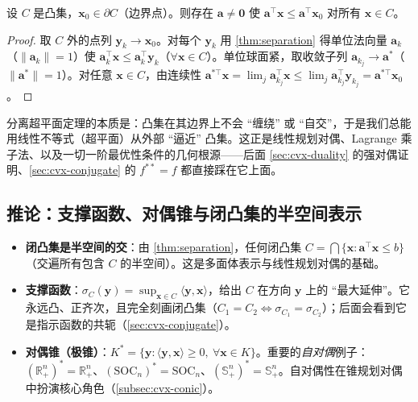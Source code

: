 \begin{theorem}[支撑超平面定理]\label{thm:supporting}
设 $C$ 是凸集，$\mathbf x_0\in\partial C$（边界点）。则存在 $\mathbf a\neq\mathbf 0$ 使 $\mathbf a^\top\mathbf x\le\mathbf a^\top\mathbf x_0$ 对所有 $\mathbf x\in C$。
\end{theorem}
\begin{proof}
取 $C$ 外的点列 $\mathbf y_k\to\mathbf x_0$。对每个 $\mathbf y_k$ 用 \cref{thm:separation} 得单位法向量 $\mathbf a_k$（$\|\mathbf a_k\|=1$）使 $\mathbf a_k^\top\mathbf x\le\mathbf a_k^\top\mathbf y_k$（$\forall\mathbf x\in C$）。单位球面紧，取收敛子列 $\mathbf a_{k_j}\to\mathbf a^\ast$（$\|\mathbf a^\ast\|=1$）。对任意 $\mathbf x\in C$，由连续性 $\mathbf a^{\ast\top}\mathbf x=\lim_j\mathbf a_{k_j}^\top\mathbf x\le\lim_j\mathbf a_{k_j}^\top\mathbf y_{k_j}=\mathbf a^{\ast\top}\mathbf x_0$。
\end{proof}

\begin{insight}[分离定理的本质]\label{ins:sep-essence}
分离超平面定理的本质是：凸集在其边界上不会 “缠绕” 或 “自交”，于是我们总能用线性不等式（超平面）从外部 “逼近” 凸集。这正是线性规划对偶、Lagrange 乘子法、以及一切一阶最优性条件的几何根源——后面 \cref{sec:cvx-duality} 的强对偶证明、\cref{sec:cvx-conjugate} 的 $f^{\ast\ast}=f$ 都直接踩在它上面。
\end{insight}

\subsection{推论：支撑函数、对偶锥与闭凸集的半空间表示}
\label{subsec:cvx-sep-cor}

\begin{itemize}
  \item \textbf{闭凸集是半空间的交}：由 \cref{thm:separation}，任何闭凸集 $C=\bigcap\{\mathbf x:\mathbf a^\top\mathbf x\le b\}$（交遍所有包含 $C$ 的半空间）。这是多面体表示与线性规划对偶的基础。
  \item \textbf{支撑函数}：$\sigma_C(\mathbf y)=\sup_{\mathbf x\in C}\langle\mathbf y,\mathbf x\rangle$，给出 $C$ 在方向 $\mathbf y$ 上的 “最大延伸”。它永远凸、正齐次，且完全刻画闭凸集（$C_1=C_2\iff\sigma_{C_1}=\sigma_{C_2}$）；后面会看到它是指示函数的共轭（\cref{sec:cvx-conjugate}）。
  \item \textbf{对偶锥（极锥）}：$K^\ast=\{\mathbf y:\langle\mathbf y,\mathbf x\rangle\ge0,\ \forall\mathbf x\in K\}$。重要的\emph{自对偶}例子：$(\mathbb{R}^n_+)^\ast=\mathbb{R}^n_+$、$(\mathrm{SOC}_n)^\ast=\mathrm{SOC}_n$、$(\mathbb{S}^n_+)^\ast=\mathbb{S}^n_+$。自对偶性在锥规划对偶中扮演核心角色（\cref{subsec:cvx-conic}）。
\end{itemize}

